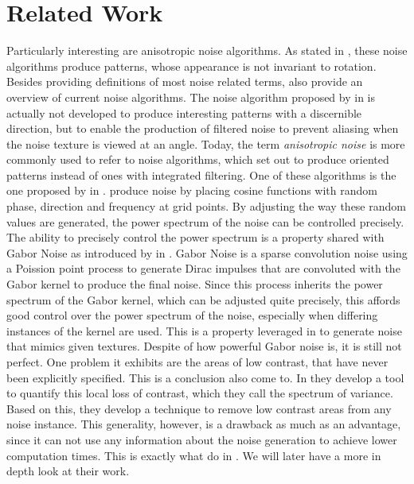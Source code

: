 \documentclass{utue} %
\begin{document}
\section{Related Work}
Particularly interesting are anisotropic noise algorithms. As stated in \cite{survey}, these noise algorithms produce patterns, whose appearance is not invariant to rotation. Besides providing definitions of most noise related terms, \citeauthor{survey} also provide an overview of current noise algorithms. The noise algorithm proposed by \citeauthor{anisotropicNoise} in \cite{anisotropicNoise} is actually not developed to produce interesting patterns with a discernible direction, but to enable the production of filtered noise to prevent aliasing when the noise texture is viewed at an angle. Today, the term \textit{anisotropic noise} is more commonly used to refer to noise algorithms, which set out to produce oriented patterns instead of ones with integrated filtering. One of these algorithms is the one proposed by \citeauthor{randomPhaseNoise} in \cite{randomPhaseNoise}. \citeauthor{randomPhaseNoise} produce noise by placing cosine functions with random phase, direction and frequency at grid points. By adjusting the way these random values are generated, the power spectrum of the noise can be controlled precisely. The ability to precisely control the power spectrum is a property shared with Gabor Noise as introduced by \citeauthor{gaborNoise} in \cite{gaborNoise}. Gabor Noise is a sparse convolution noise using a Poission point process to generate Dirac impulses that are convoluted with the Gabor kernel to produce the final noise. Since this process inherits the power spectrum of the Gabor kernel, which can be adjusted quite precisely, this affords good control over the power spectrum of the noise, especially when differing instances of the kernel are used. This is a property leveraged in \cite{gaborNoiseByExample} to generate noise that mimics given textures. Despite of how powerful Gabor noise is, it is still not perfect. One problem it exhibits are the areas of low contrast, that have never been explicitly specified. This is a conclusion \citeauthor{spectrumOfVariance} also come to. In \cite{spectrumOfVariance} they develop a tool to quantify this local loss of contrast, which they call the spectrum of variance. Based on this, they develop a technique to remove low contrast areas from any noise instance. This generality, however, is a drawback as much as an advantage, since it can not use any information about the noise generation to achieve lower computation times. This is exactly what \citeauthor{phasorNoise} do in \cite{phasorNoise}. We will later have a more in depth look at their work.\\
\end{document}
